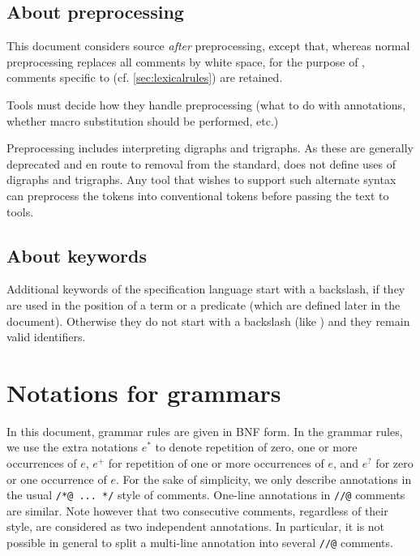 

\subsection{About preprocessing}

This document considers \lang source \emph{after} preprocessing, except that, whereas normal preprocessing replaces all comments by white space, 
for the purpose of 
\NAME, comments specific to \NAME (cf. \ref{sec:lexicalrules}) are retained.

Tools must decide how they handle preprocessing (what to do with
annotations, whether macro substitution should be performed, etc.)

Preprocessing includes interpreting \lang digraphs and trigraphs.
As these are generally deprecated and en route to removal from the \lang
standard, \NAME does not define uses of digraphs and trigraphs. Any tool that wishes to support such alternate syntax can preprocess the tokens into conventional tokens before passing the text to \NAME tools.


\subsection{About keywords}

Additional keywords of the specification language start with a
backslash, if they are used in the position of a term or a predicate
(which are defined later in the document).  Otherwise they do not start
with a backslash (like \ensures{}) and they remain valid identifiers.

\section{Notations for grammars}

In this document, grammar rules are given in BNF form. In the grammar
rules, we use the extra notations $e^*$ to denote repetition of zero, one
or more occurrences of $e$, $e^+$ for repetition of one or more
occurrences of $e$, and $e^?$ for zero or one occurrence of $e$.  For
the sake of simplicity, we only describe annotations in the usual
\lstinline|/*@ ... */| style of comments. One-line annotations
in \lstinline|//@| comments are similar. Note however that two consecutive
comments, regardless of their style, are considered as two independent
annotations. In particular, it is not possible in general to split a multi-line
annotation into several \lstinline|//@| comments.

